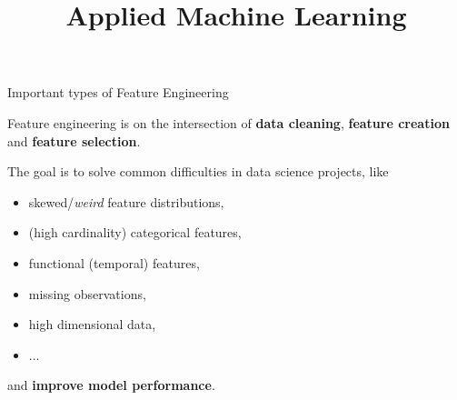 \documentclass[11pt,compress,t,notes=noshow, xcolor=table]{beamer}
\title{Applied Machine Learning}
\date{}
\begin{document}



\begin{vbframe}{Important types of Feature Engineering}

Feature engineering is on the intersection of \textbf{data cleaning}, \textbf{feature creation} and \textbf{feature selection}.

\lz

The goal is to solve common difficulties in data science projects, like

\begin{itemize}
\item skewed/\textit{weird} feature distributions,
\item (high cardinality) categorical features,
\item functional (temporal) features,
\item missing observations,
\item high dimensional data,
\item ...
\end{itemize}

and \textbf{improve model performance}.

\end{vbframe}

\end{document}
